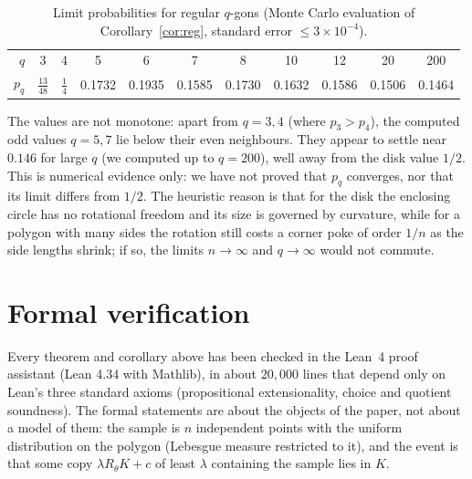 \documentclass[11pt]{amsart}
\theoremstyle{remark}\newtheorem{remark}[theorem]{Remark}
\begin{document}
\begin{table}[ht]
\centering
\begin{tabular}{rcccccccccc}
\toprule
$q$ & 3 & 4 & 5 & 6 & 7 & 8 & 10 & 12 & 20 & 200\\
$p_q$ & $\tfrac{13}{48}$ & $\tfrac14$ & 0.1732 & 0.1935 & 0.1585 & 0.1730 & 0.1632 & 0.1586 & 0.1506 & 0.1464\\
\bottomrule
\end{tabular}
\caption{Limit probabilities for regular $q$-gons (Monte Carlo evaluation of Corollary~\ref{cor:reg},
standard error $\le3\times10^{-4}$).}
\label{tab:reg}
\end{table}

The values are not monotone: apart from $q=3,4$ (where $p_3>p_4$), the computed odd values $q=5,7$ lie below
their even neighbours. They appear to settle near $0.146$ for large $q$ (we computed up to $q=200$), well away from the disk value $1/2$.
This is numerical evidence only: we have not proved that $p_q$ converges, nor that its limit differs from $1/2$. The
heuristic reason is that for the disk the enclosing circle has no rotational freedom and its size is governed by
curvature, while for a polygon with many sides the rotation still costs a corner poke of order $1/n$ as the side
lengths shrink; if so, the limits $n\to\infty$ and $q\to\infty$ would not commute.

\section{Formal verification}\label{sec:lean}

Every theorem and corollary above has been checked in the Lean~4 proof assistant (Lean 4.34 with Mathlib), in about
$20{,}000$ lines that depend only on Lean's three standard axioms (propositional extensionality, choice and quotient
soundness). The formal statements are about the objects of the paper, not about a model of them: the sample is
$n$ independent points with the uniform distribution on the polygon (Lebesgue measure restricted to it), and the event
is that some copy $\lambda R_\theta K+c$ of least $\lambda$ containing the sample lies in $K$.
\end{document}
